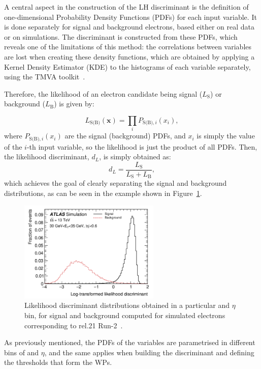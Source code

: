 A central aspect in the construction of the LH discriminant is the definition of one-dimensional Probability Density Functions (PDFs) for each input variable. It is done separately for signal and background electrons, based either on real data or on simulations.
The discriminant is constructed from these PDFs, which reveals one of the limitations of this method: the correlations between variables are lost when creating these density functions, which are obtained by applying a Kernel Density Estimator (KDE) to the histograms of each variable separately, using the TMVA toolkit~\cite{tmvatoolkit}. 

Therefore, the likelihood of an electron candidate being signal ($L_{\text{S}}$) or background ($L_{\text{B}}$) is given by:

\begin{equation}
  L_{\text{S(B)}} (\textbf{x}) = \prod_{i} P_{\text{S(B)},i}(x_{i}),
\end{equation}
where $P_{\text{S(B)},i}(x_{i})$ are the signal (background) PDFs, and $x_{i}$ is simply the value of the $i$-th input variable, so the likelihood is just the product of all PDFs.
Then, the likelihood discriminant, $d_{L}$, is simply obtained as:
\begin{equation}
  d_{L} = \frac{L_{\text{S}}}{L_{\text{S}} + L_{\text{B}}},
\end{equation}
which achieves the goal of clearly separating the signal and background distributions, as can be seen in the example shown in Figure~\ref{fig:lhdis}.
\begin{figure}[htbp]
  \centering
  \includegraphics[width=0.6\textwidth]{images/lhdis.png}
  \caption{Likelihood discriminant distributions obtained in a particular \et and $\eta$ bin, for signal and background computed for simulated electrons corresponding to rel.21 Run-2~\cite{Aaboud:2657964}.}
  \label{fig:lhdis}
\end{figure}

As previously mentioned, the PDFs of the variables are parametrised in different bins of \et and $\eta$, and the same applies when building the discriminant and defining the thresholds that form the WPs.

